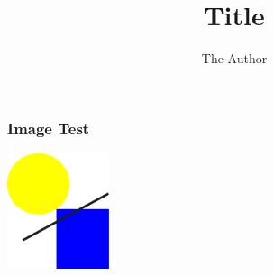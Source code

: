 \documentclass{beamer}
\title{Title}
\author{The Author}
\begin{document}
\frame{\titlepage}

\begin{frame}
    \frametitle{Image Test}
    \includegraphics[width=3cm]{diagram.pdf}
\end{frame}
\end{document}
